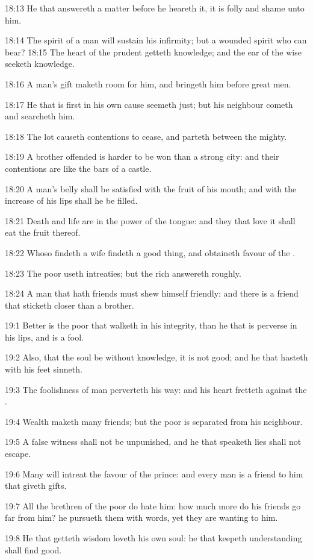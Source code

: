 18:13 He that answereth a matter before he heareth it, it is folly and shame unto him.

18:14 The spirit of a man will sustain his infirmity; but a wounded spirit who can bear?  18:15 The heart of the prudent getteth knowledge; and the ear of the wise seeketh knowledge.

18:16 A man's gift maketh room for him, and bringeth him before great men.

18:17 He that is first in his own cause seemeth just; but his neighbour cometh and searcheth him.

18:18 The lot causeth contentions to cease, and parteth between the mighty.

18:19 A brother offended is harder to be won than a strong city: and their contentions are like the bars of a castle.

18:20 A man's belly shall be satisfied with the fruit of his mouth; and with the increase of his lips shall he be filled.

18:21 Death and life are in the power of the tongue: and they that love it shall eat the fruit thereof.

18:22 Whoso findeth a wife findeth a good thing, and obtaineth favour of the \LORD.

18:23 The poor useth intreaties; but the rich answereth roughly.

18:24 A man that hath friends must shew himself friendly: and there is a friend that sticketh closer than a brother.

19:1 Better is the poor that walketh in his integrity, than he that is perverse in his lips, and is a fool.

19:2 Also, that the soul be without knowledge, it is not good; and he that hasteth with his feet sinneth.

19:3 The foolishness of man perverteth his way: and his heart fretteth against the \LORD.

19:4 Wealth maketh many friends; but the poor is separated from his neighbour.

19:5 A false witness shall not be unpunished, and he that speaketh lies shall not escape.

19:6 Many will intreat the favour of the prince: and every man is a friend to him that giveth gifts.

19:7 All the brethren of the poor do hate him: how much more do his friends go far from him? he pursueth them with words, yet they are wanting to him.

19:8 He that getteth wisdom loveth his own soul: he that keepeth understanding shall find good.

